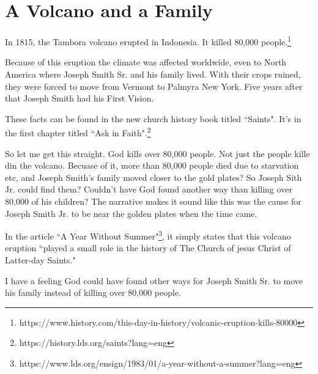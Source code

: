 \chapter{A Volcano and a Family}

In 1815, the Tambora volcano erupted in Indonesia. It killed 80,000 people.\footnote{
https://www.history.com/this-day-in-history/volcanic-eruption-kills-80000
}

Because of this eruption the climate was affected worldwide, even to North America
where Joseph Smith Sr. and his family lived. With their crops ruined, they were
forced to move from Vermont to Palmyra New York. Five years after that Joseph Smith
had his First Vision.

These facts can be found in the new church history book titled ``Saints". It's in the
first chapter titled ``Ask in Faith".\footnote{https://history.lds.org/saints?lang=eng}

So let me get this straight. God kills over 80,000 people. Not just the people kille
din the volcano. Becuase of it, more than 80,000 people died due to starvation etc,
and Joseph Smith's family moved closer to the gold plates? So Joseph Sith Jr. could
find them? Couldn't have God found another way than killing over 80,000 of his
children? The narrative makes it sound like this was the cause for Joseph Smith Jr.
to be near the golden plates when the time came.

In the article ``A Year Without Summer"\footnote{
https://www.lds.org/ensign/1983/01/a-year-without-a-summer?lang=eng}, it simply
states that this volcano eruption ``played a small role in the history of The Church
of jesus Christ of Latter-day Saints."

I have a feeling God could have found other ways for Joseph Smith Sr. to move his
family instead of killing over 80,000 people.